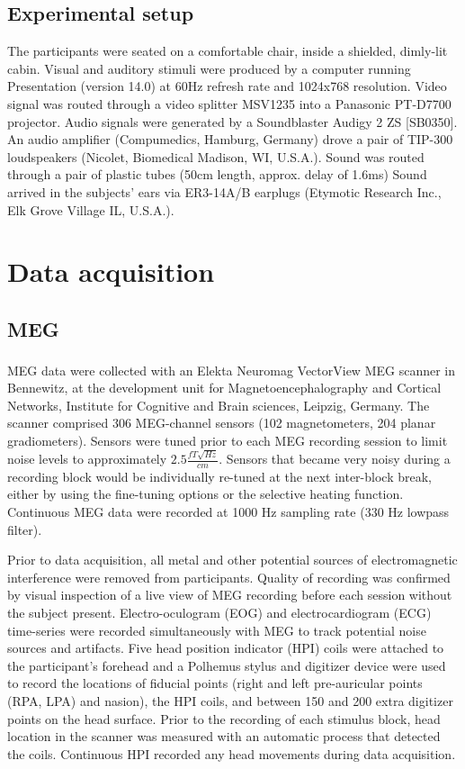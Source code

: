 \subsection{Experimental setup}
The participants were seated on a comfortable chair, inside a shielded, dimly-lit cabin.
Visual and auditory stimuli were produced by a computer running Presentation (version 14.0) at 60Hz refresh rate and 1024x768 resolution.
Video signal was routed through a video splitter MSV1235 into a Panasonic PT-D7700 projector.
Audio signals were generated by a Soundblaster Audigy 2 ZS [SB0350].
An audio amplifier (Compumedics, Hamburg, Germany) drove a pair of TIP-300 loudspeakers (Nicolet, Biomedical Madison, WI, U.S.A.).
Sound was routed through a pair of plastic tubes (50cm length, approx. delay of 1.6ms)
Sound arrived in the subjects' ears via ER3-14A/B earplugs (Etymotic Research Inc., Elk Grove Village IL, U.S.A.).

\section{Data acquisition}

\subsection {MEG}
MEG data were collected with an Elekta Neuromag VectorView\textsuperscript{\textregistered} MEG scanner in Bennewitz, at the development unit for Magnetoencephalography and Cortical Networks, Institute for Cognitive and Brain sciences, Leipzig, Germany.
The scanner comprised 306 MEG-channel sensors (102 magnetometers, 204 planar gradiometers).
Sensors were tuned prior to each MEG recording session to limit noise levels to approximately $2.5 \frac{fT\sqrt{Hz}}{cm}$.
Sensors that became very noisy during a recording block would be individually re-tuned at the next inter-block break, either by using the fine-tuning options or the selective heating function.
Continuous MEG data were recorded at 1000 Hz sampling rate (330 Hz lowpass filter).

Prior to data acquisition, all metal and other potential sources of electromagnetic interference were removed from participants.
Quality of recording was confirmed by visual inspection of a live view of MEG recording before each session without the subject present.
Electro-oculogram (EOG) and electrocardiogram (ECG) time-series were recorded simultaneously with MEG to track potential noise sources and artifacts.
Five head position indicator (HPI) coils were attached to the participant's forehead and a Polhemus stylus and digitizer device were used to record the locations of fiducial points (right and left pre-auricular points (RPA, LPA) and nasion), the HPI coils, and between 150 and 200 extra digitizer points on the head surface.
Prior to the recording of each stimulus block, head location in the scanner was measured with an automatic process that detected the coils.
Continuous HPI recorded any head movements during data acquisition.

